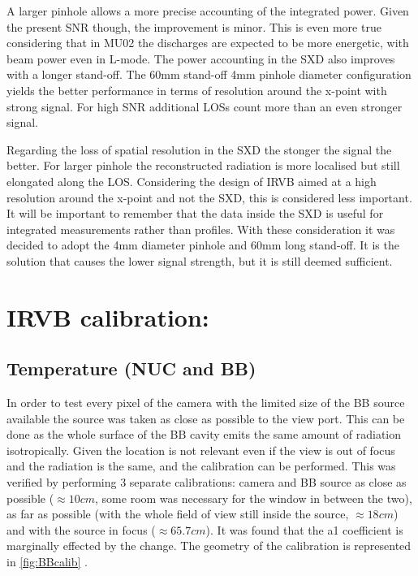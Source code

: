 A larger pinhole allows a more precise accounting of the integrated power. Given the present SNR though, the improvement is minor. This is even more true considering that in MU02 the discharges are expected to be more energetic, with beam power even in L-mode. The power accounting in the SXD also improves with a longer stand-off.
The 60mm stand-off 4mm pinhole diameter configuration yields the better performance in terms of resolution around the x-point with strong signal. For high SNR additional LOSs count more than an even stronger signal.

Regarding the loss of spatial resolution in the SXD the stonger the signal the better. For larger pinhole the reconstructed radiation is more localised but still elongated along the LOS. Considering the design of IRVB aimed at a high resolution around the x-point and not the SXD, this is considered less important. It will be important to remember that the data inside the SXD is useful for integrated measurements rather than profiles.
With these consideration it was decided to adopt the 4mm diameter pinhole and 60mm long stand-off. It is the solution that causes the lower signal strength, but it is still deemed sufficient.

\section{IRVB calibration:}
\subsection{Temperature (NUC and BB)}

In order to test every pixel of the camera with the limited size of the BB source available the source was taken as close as possible to the view port. This can be done as the whole surface of the BB cavity emits the same amount of radiation isotropically. Given the location is not relevant even if the view is out of focus and the radiation is the same, and the calibration can be performed. This was verified by performing 3 separate calibrations: camera and BB source as close as possible ($\approx 10cm$, some room was necessary for the window in between the two), as far as possible (with the whole field of view still inside the source, $\approx 18cm$) and with the source in focus ($\approx 65.7cm$). It was found that the a1 coefficient is marginally effected by the change.
The geometry of the calibration is represented in \autoref{fig:BBcalib} .

